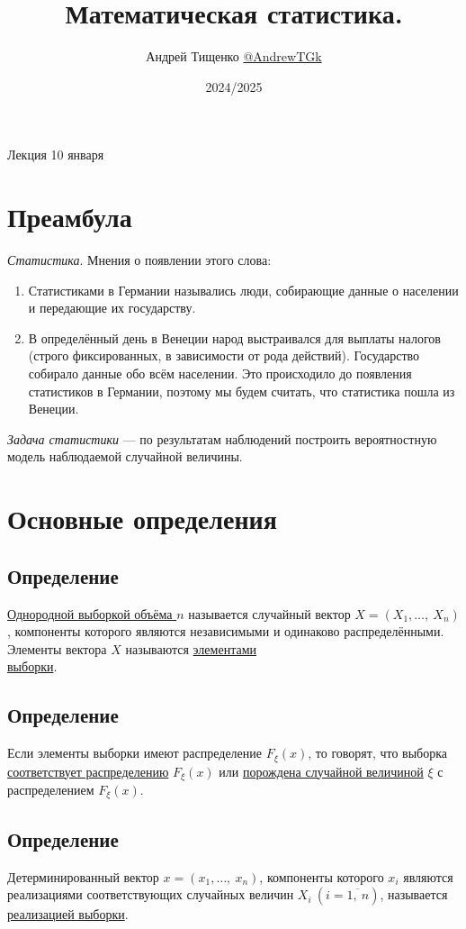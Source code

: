 \documentclass[12pt, a4paper]{article}
\title{Математическая статистика.}
\author{Андрей Тищенко \href{https://t.me/AndrewTGk}{@AndrewTGk}}
\date{2024/2025}
\begin{document}
\maketitle
\begin{center}
    Лекция 10 января
\end{center}
\section*{Преамбула}
\textit{Статистика}. Мнения о появлении этого слова:
\begin{enumerate}
    \item Статистиками в Германии назывались люди, собирающие данные о населении и передающие их государству.
    \item В определённый день в Венеции народ выстраивался для выплаты налогов (строго фиксированных, в зависимости от рода действий). Государство собирало данные обо всём населении. Это происходило до появления статистиков в Германии, поэтому мы будем считать, что статистика пошла из Венеции.
\end{enumerate}
\textit{Задача статистики} --- по результатам наблюдений построить вероятностную модель наблюдаемой случайной величины.
\section*{Основные определения}
\subsection*{Определение}
\underline{Однородной выборкой объёма $n$} называется случайный вектор $X = (X_1,\dots,\ X_n)$, компоненты которого являются независимыми и одинаково распределёнными. Элементы вектора $X$ называются \underline{элементами}\\\underline{выборки}. 
\subsection*{Определение}
Если элементы выборки имеют распределение $F_{\xi}(x)$, то говорят, что выборка \underline{соответствует распределению} $F_{\xi}(x)$ или \underline{порождена случайной величиной} $\xi$ с распределением $F_{\xi}(x)$. 
\subsection*{Определение}
Детерминированный вектор $x = (x_1,\dots,\ x_n)$, компоненты которого $x_i$ являются реализациями соответствующих случайных величин $X_i\ (i = \overline{1,\ n})$, называется \underline{реализацией выборки}.
\end{document}
